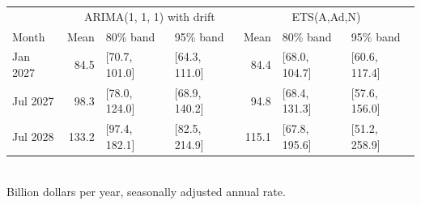 \begin{tabular}{lrllrll}
\toprule
 & \multicolumn{3}{c}{ARIMA(1, 1, 1) with drift} & \multicolumn{3}{c}{ETS(A,Ad,N)} \\
Month & Mean & 80\% band & 95\% band & Mean & 80\% band & 95\% band \\
\midrule
Jan 2027 & 84.5 & [70.7, 101.0] & [64.3, 111.0] & 84.4 & [68.0, 104.7] & [60.6, 117.4] \\
Jul 2027 & 98.3 & [78.0, 124.0] & [68.9, 140.2] & 94.8 & [68.4, 131.3] & [57.6, 156.0] \\
Jul 2028 & 133.2 & [97.4, 182.1] & [82.5, 214.9] & 115.1 & [67.8, 195.6] & [51.2, 258.9] \\
\bottomrule
\end{tabular}
\\[2pt] {\footnotesize Billion dollars per year, seasonally adjusted annual rate.}